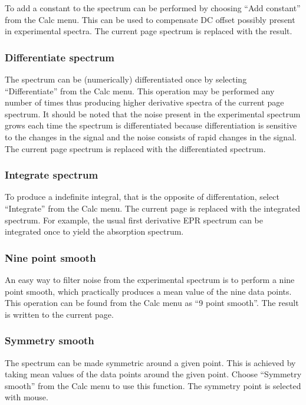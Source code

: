 \documentclass[byrevtex,amssymb,aps,pra,floatfix,letterpaper]{revtex4}
\begin{document}
To add a constant to the spectrum can be performed by choosing ``Add constant'' from the Calc menu. This can be used to compensate DC offset possibly present in experimental spectra. The current page spectrum is replaced with the result.

\subsubsection{Differentiate spectrum}

The spectrum can be (numerically) differentiated once by selecting ``Differentiate'' from the Calc menu. This operation may be performed any number of times thus producing higher derivative spectra of the current page spectrum. It should be noted that the noise present in the experimental spectrum grows each time the spectrum is differentiated because differentiation is sensitive to the changes in the signal and the noise consists of rapid changes in the signal. The current page spectrum is replaced with the differentiated spectrum.

\subsubsection{Integrate spectrum}

To produce a indefinite integral, that is the opposite of differentation, select ``Integrate'' from the Calc menu. The current page is replaced with the integrated spectrum. For example, the usual first derivative EPR spectrum can be integrated once to yield the absorption spectrum.

\subsubsection{Nine point smooth}

An easy way to filter noise from the experimental spectrum is to perform a nine point smooth, which practically produces a mean value of the nine data points. This operation can be found from the Calc menu as ``9 point smooth''. The result is written to the current page.

\subsubsection{Symmetry smooth}

The spectrum can be made symmetric around a given point. This is achieved by taking mean values of the data points around the given point. Choose ``Symmetry smooth'' from the Calc menu to use this function. The symmetry point is selected with mouse.
\end{document}
